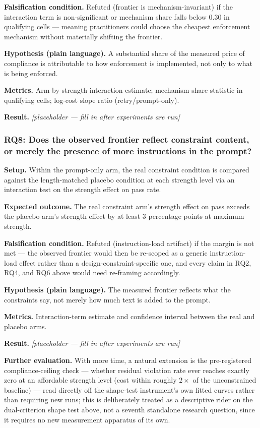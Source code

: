\documentclass[11pt]{article}
\newcommand{\ph}{\textit{[placeholder --- fill in after experiments are run]}}
\begin{document}
\textbf{Falsification condition.} Refuted (frontier is mechanism-invariant) if the interaction term is non-significant or mechanism share falls below 0.30 in qualifying cells --- meaning practitioners could choose the cheapest enforcement mechanism without materially shifting the frontier.

\textbf{Hypothesis (plain language).} A substantial share of the measured price of compliance is attributable to how enforcement is implemented, not only to what is being enforced.

\textbf{Metrics.} Arm-by-strength interaction estimate; mechanism-share statistic in qualifying cells; log-cost slope ratio (retry/prompt-only).

\textbf{Result.} \ph

\subsubsection{RQ8: Does the observed frontier reflect constraint content, or merely the presence of more instructions in the prompt?}
\textbf{Setup.} Within the prompt-only arm, the real constraint condition is compared against the length-matched placebo condition at each strength level via an interaction test on the strength effect on pass rate.

\textbf{Expected outcome.} The real constraint arm's strength effect on pass exceeds the placebo arm's strength effect by at least 3 percentage points at maximum strength.

\textbf{Falsification condition.} Refuted (instruction-load artifact) if the margin is not met --- the observed frontier would then be re-scoped as a generic instruction-load effect rather than a design-constraint-specific one, and every claim in RQ2, RQ4, and RQ6 above would need re-framing accordingly.

\textbf{Hypothesis (plain language).} The measured frontier reflects what the constraints say, not merely how much text is added to the prompt.

\textbf{Metrics.} Interaction-term estimate and confidence interval between the real and placebo arms.

\textbf{Result.} \ph

\vspace{0.5em}
\noindent\textbf{Further evaluation.} With more time, a natural extension is the pre-registered compliance-ceiling check --- whether residual violation rate ever reaches exactly zero at an affordable strength level (cost within roughly $2\times$ of the unconstrained baseline) --- read directly off the shape-test instrument's own fitted curves rather than requiring new runs; this is deliberately treated as a descriptive rider on the dual-criterion shape test above, not a seventh standalone research question, since it requires no new measurement apparatus of its own.
\end{document}
